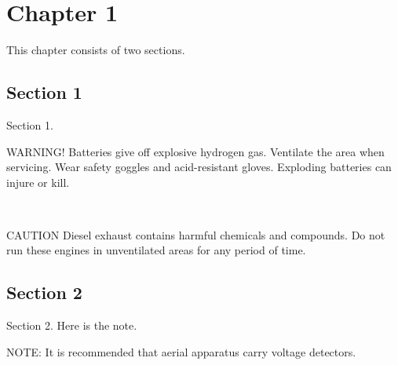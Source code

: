 \chapter{Chapter 1}
\label{chapter:1}

This chapter consists of two sections.

\section{Section 1}
\label{section:1}

Section 1.

\begin{sidebar}[css-class=warning]{WARNING!}
Batteries give off explosive hydrogen gas. Ventilate the area when servicing. Wear safety goggles and acid-resistant gloves. Exploding batteries can injure or kill.
\end{sidebar}\\

\begin{sidebar}[css-class=caution]{CAUTION}
Diesel exhaust contains harmful chemicals and compounds. Do not run these engines in unventilated areas for any period of time.
\end{sidebar}

\section{Section 2}
\label{section:2}

Section 2. Here is the note.

\begin{sidebar}[css-class=note]{NOTE:} It is recommended that aerial apparatus carry voltage detectors. \end{sidebar}